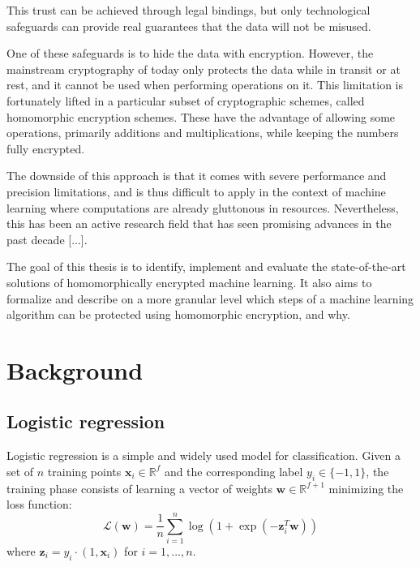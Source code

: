 \documentclass[a4paper,11pt,oneside]{report}
\begin{document}
This trust can be achieved through legal bindings, but only technological safeguards can provide real guarantees that the data will not be misused.

One of these safeguards is to hide the data with encryption. However, the mainstream cryptography of today only protects the data while in transit or at rest, and it cannot be used when performing operations on it. This limitation is fortunately lifted in a particular subset of cryptographic schemes, called homomorphic encryption schemes. These have the advantage of allowing some operations, primarily additions and multiplications, while keeping the numbers fully encrypted.

The downside of this approach is that it comes with severe performance and precision limitations, and is thus difficult to apply in the context of machine learning where computations are already gluttonous in resources. Nevertheless, this has been an active research field that has seen promising advances in the past decade [...].

The goal of this thesis is to identify, implement and evaluate the state-of-the-art solutions of homomorphically encrypted machine learning. It also aims to formalize and describe on a more granular level which steps of a machine learning algorithm can be protected using homomorphic encryption, and why.


\chapter{Background}



\section{Logistic regression}

Logistic regression is a simple and widely used model for classification. Given a set of $n$ training points $\mathbf{x}_i \in \mathbb{R}^f$ and the corresponding label $y_i \in \{-1,1\}$, the training phase consists of learning a vector of weights $\mathbf{w} \in \mathbb{R}^{f+1}$ minimizing the loss function:
\begin{equation}\label{logistic_reg}
    \mathcal{L}(\mathbf{w}) = \frac{1}{n} \sum_{i=1}^{n} \log(1 + \exp(-\mathbf{z}_i^T \mathbf{w})) 
\end{equation}
where $\mathbf{z}_i = y_i \cdot (1, \mathbf{x}_i)$ for $i=1,...,n$.
\end{document}
